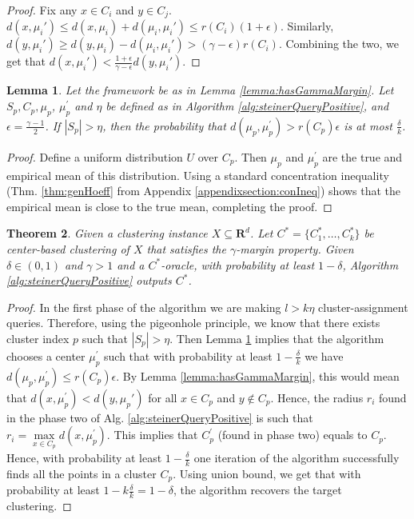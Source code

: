 \documentclass[12pt]{article}
\newcommand{\mb}{\mathbf}
\newtheorem{theorem}{Theorem}
\newtheorem{lemma}[theorem]{Lemma}
\begin{document}
\begin{proof}
Fix any $x \in C_i$ and $y \in C_j$. $d(x, \mu_i') \le d(x, \mu_i)+d(\mu_i, \mu_i') \le r(C_i) (1+\epsilon)$. Similarly, $d(y, \mu_i') \ge d(y, \mu_i) - d(\mu_i, \mu_i') > (\gamma -\epsilon)r(C_i)$. Combining the two, we get that $d(x, \mu_i') < \frac{1+\epsilon}{\gamma-\epsilon}d(y, \mu_i')$. 
\end{proof}

\begin{lemma}
\label{lemma:phase1}
Let the framework be as in Lemma \ref{lemma:hasGammaMargin}. Let $S_p, C_p, \mu_p$, $\mu_p^\prime$ and $\eta$ be defined as in Algorithm \ref{alg:steinerQueryPositive}, and $\epsilon = \frac{\gamma - 1}{2}$. If $|S_p| > \eta$, then the probability that $d(\mu_p, \mu_p^\prime) > r(C_p)\epsilon$ is at most $\frac{\delta}{k}$.
\end{lemma}
\begin{proof}
Define a uniform distribution $U$ over $C_p$. Then $\mu_p$ and $\mu_p^\prime$ are the true and empirical mean of this distribution. Using a standard concentration inequality (Thm. \ref{thm:genHoeff} from Appendix \ref{appendixsection:conIneq}) shows that the empirical mean is close to the true mean, completing the proof. 

\end{proof}

\begin{theorem}
\label{thm:steinerQueryPositive}
Given a clustering instance $X \subseteq \mb R^d$. Let $C^* = \{C_1^*, \ldots, C_k^*\}$ be center-based clustering of $X$ that satisfies the $\gamma$-margin property. Given $\delta \in (0, 1)$ and $\gamma > 1$ and a $C^*$-oracle, with probability at least $1-\delta$, Algorithm \ref{alg:steinerQueryPositive} outputs $C^*$.
\end{theorem}

\begin{proof}
In the first phase of the algorithm we are making $l>k\eta$ cluster-assignment queries. Therefore, using the pigeonhole principle, we know that there exists cluster index $p$ such that $|S_p| > \eta$. Then Lemma \ref{lemma:phase1} implies that the algorithm chooses a center $\mu_p^\prime$ such that with probability at least $1-\frac{\delta}{k}$ we have $d(\mu_p, \mu_p^\prime) \le r(C_p)\epsilon$. By Lemma \ref{lemma:hasGammaMargin}, this would mean that $d(x, \mu_p^\prime) < d(y, \mu_p')$ for all $x \in C_p$ and $y \not\in C_p$. Hence, the radius $r_i$ found in the phase two of Alg. \ref{alg:steinerQueryPositive} is such that $r_{i} = \max\limits_{x \in C_p} d(x, \mu_p^\prime)$. This implies that $C_p^\prime$ (found in phase two) equals to $C_p$. Hence, with probability at least $1-\frac{\delta}{k}$ one iteration of the algorithm successfully finds all the points in a cluster $C_p$. Using union bound, we get that with probability at least $1-k\frac{\delta}{k} = 1-\delta$, the algorithm recovers the target clustering.
\end{proof}
\end{document}
